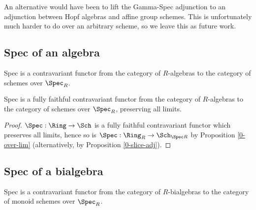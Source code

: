 An alternative would have been to lift the Gamma-Spec adjunction to an adjunction between
Hopf algebras and affine group schemes.
This is unfortunately much harder to do over an arbitrary scheme,
so we leave this as future work.


\subsection{Spec of an algebra}


\begin{definition}
  \label{0-spec-alg}
  \leanok

  Spec is a contravariant functor from the category of $R$-algebras
  to the category of schemes over $\Spec_R$.
\end{definition}


\begin{proposition}
  \label{0-full-faithful-spec-alg}
  \leanok

  Spec is a fully faithful contravariant functor from the category of $R$-algebras
  to the category of schemes over $\Spec_R$, preserving all limits.
\end{proposition}
\begin{proof}
  \leanok

  $\Spec : \Ring \to \Sch$ is a fully faithful contravariant functor which preserves all limits,
  hence so is $\Spec : \Ring_R \to \Sch_{\Spec R}$ by Proposition \ref{0-over-lim}
  (alternatively, by Proposition \ref{0-slice-adj}).
\end{proof}


\subsection{Spec of a bialgebra}


\begin{definition}
  \label{0-spec-bialg}
  \leanok

  Spec is a contravariant functor from the category of $R$-bialgebras
  to the category of monoid schemes over $\Spec_R$.
\end{definition}


